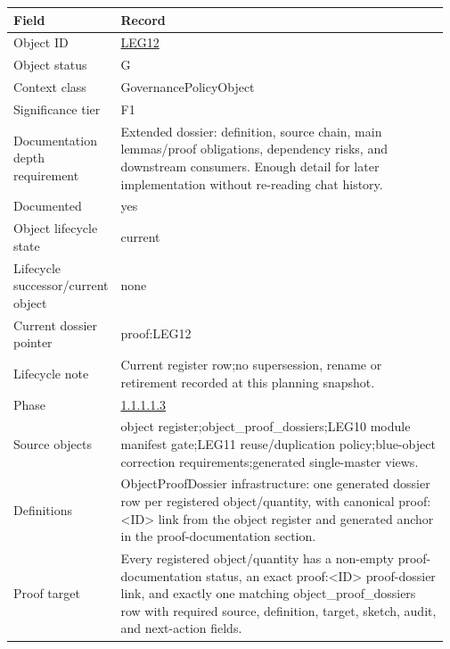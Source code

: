 \begin{longtable}{L{0.16\linewidth} L{0.81\linewidth}}
\hline
\textbf{Field} & \textbf{Record}\\
\hline
Object ID & \hyperlink{object-row-LEG12}{LEG12}\\
\hline\addlinespace[0.20em]
Object status & G\\
\hline\addlinespace[0.20em]
Context class & GovernancePolicyObject\\
\hline\addlinespace[0.20em]
Significance tier & F1\\
\hline\addlinespace[0.20em]
Documentation depth requirement & Extended dossier: definition, source chain, main lemmas/\allowbreak{}proof obligations, dependency risks, and downstream consumers. Enough detail for later implementation without re-reading chat history.\\
\hline\addlinespace[0.20em]
Documented & yes\\
\hline\addlinespace[0.20em]
Object lifecycle state & current\\
\hline\addlinespace[0.20em]
Lifecycle successor/\allowbreak{}current object & none\\
\hline\addlinespace[0.20em]
Current dossier pointer & proof:LEG12\\
\hline\addlinespace[0.20em]
Lifecycle note & Current register row;\newline no supersession, rename or retirement recorded at this planning snapshot.\\
\hline\addlinespace[0.20em]
Phase & \hyperlink{phase-row-1-1-1-1-3}{1.1.1.1.3}\\
\hline\addlinespace[0.20em]
Source objects & object register;\newline object\_proof\_dossiers;\newline LEG10 module manifest gate;\newline LEG11 reuse/\allowbreak{}duplication policy;\newline blue-object correction requirements;\newline generated single-master views.\\
\hline\addlinespace[0.20em]
Definitions & ObjectProofDossier infrastructure: one generated dossier row per registered object/\allowbreak{}quantity, with canonical proof:<ID> link from the object register and generated anchor in the proof-documentation section.\\
\hline\addlinespace[0.20em]
Proof target & Every registered object/\allowbreak{}quantity has a non-empty proof-documentation status, an exact proof:<ID> proof-dossier link, and exactly one matching object\_proof\_dossiers row with required source, definition, target, sketch, audit, and next-action fields.\\

\end{longtable}
